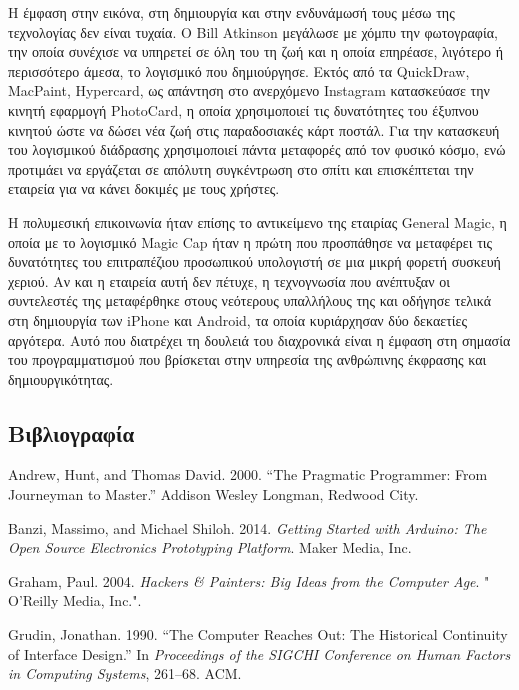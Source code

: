 \documentclass[
]{article}
\newlength{\cslhangindent}
\newlength{\cslentryspacingunit} %
\newenvironment{CSLReferences}[2] %
 {%
  \setlength{\parindent}{0pt}
  \ifodd #1
  \let\oldpar\par
  \def\par{\hangindent=\cslhangindent\oldpar}
  \fi
  \setlength{\parskip}{#2\cslentryspacingunit}
 }%
 {}
\begin{document}
Η έμφαση στην εικόνα, στη δημιουργία και στην ενδυνάμωσή τους μέσω της
τεχνολογίας δεν είναι τυχαία. Ο Bill Atkinson μεγάλωσε με χόμπυ την
φωτογραφία, την οποία συνέχισε να υπηρετεί σε όλη του τη ζωή και η οποία
επηρέασε, λιγότερο ή περισσότερο άμεσα, το λογισμικό που δημιούργησε.
Εκτός από τα QuickDraw, MacPaint, Hypercard, ως απάντηση στο ανερχόμενο
Instagram κατασκεύασε την κινητή εφαρμογή PhotoCard, η οποία
χρησιμοποιεί τις δυνατότητες του έξυπνου κινητού ώστε να δώσει νέα ζωή
στις παραδοσιακές κάρτ ποστάλ. Για την κατασκευή του λογισμικού
διάδρασης χρησιμοποιεί πάντα μεταφορές από τον φυσικό κόσμο, ενώ
προτιμάει να εργάζεται σε απόλυτη συγκέντρωση στο σπίτι και επισκέπτεται
την εταιρεία για να κάνει δοκιμές με τους χρήστες.

Η πολυμεσική επικοινωνία ήταν επίσης το αντικείμενο της εταιρίας General
Magic, η οποία με το λογισμικό Magic Cap ήταν η πρώτη που προσπάθησε να
μεταφέρει τις δυνατότητες του επιτραπέζιου προσωπικού υπολογιστή σε μια
μικρή φορετή συσκευή χεριού. Αν και η εταιρεία αυτή δεν πέτυχε, η
τεχνογνωσία που ανέπτυξαν οι συντελεστές της μεταφέρθηκε στους νεότερους
υπαλλήλους της και οδήγησε τελικά στη δημιουργία των iPhone και Android,
τα οποία κυριάρχησαν δύο δεκαετίες αργότερα. Αυτό που διατρέχει τη
δουλειά του διαχρονικά είναι η έμφαση στη σημασία του προγραμματισμού
που βρίσκεται στην υπηρεσία της ανθρώπινης έκφρασης και
δημιουργικότητας.

\hypertarget{ux3b2ux3b9ux3b2ux3bbux3b9ux3bfux3b3ux3c1ux3b1ux3c6ux3afux3b1}{%
\subsection*{Βιβλιογραφία}\label{ux3b2ux3b9ux3b2ux3bbux3b9ux3bfux3b3ux3c1ux3b1ux3c6ux3afux3b1}}

\hypertarget{refs}{}
\begin{CSLReferences}{0}{0}
\end{CSLReferences}

Andrew, Hunt, and Thomas David. 2000. {``The Pragmatic Programmer: From
Journeyman to Master.''} Addison Wesley Longman, Redwood City.

Banzi, Massimo, and Michael Shiloh. 2014. \emph{Getting Started with
Arduino: The Open Source Electronics Prototyping Platform}. Maker Media,
Inc.

Graham, Paul. 2004. \emph{Hackers \& Painters: Big Ideas from the
Computer Age}. " O'Reilly Media, Inc.".

Grudin, Jonathan. 1990. {``The Computer Reaches Out: The Historical
Continuity of Interface Design.''} In \emph{Proceedings of the SIGCHI
Conference on Human Factors in Computing Systems}, 261--68. ACM.
\end{document}
